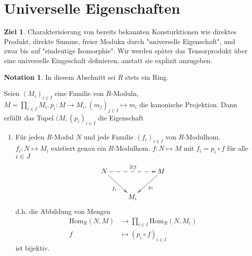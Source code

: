 \documentclass[a4paper, titlepage]{article}
\theoremstyle{definition}
\newtheorem*{ziel}{Ziel}
\newtheorem*{notation}{Notation}
\newcommand{\Hom}{\mathrm{Hom}}
\begin{document}
        \section{Universelle Eigenschaften}
        \begin{ziel}
            Charakterisierung von bereits bekannten Konsturktionen wie direktes Produkt, direkte Summe, freier Modukn durch "universelle Eigenschaft", und zwar bis auf "eindeutige Isomorphie". Wir werden später das Tensorprodukt über eine universelle Eingeschaft definieren, anstatt sie explizit anzugeben.
        \end{ziel}
        \begin{notation}
            In diesem Abschnitt sei $R$ stets ein Ring.
        \end{notation}
        \begin{satz}
            Seien $(M_i)_{i\in I}$ eine Familie von $R$-Moduln, $M=\prod\limits_{i\in I}M_i, p_i:M\longrightarrow M_i, (m_j)_{j\in I}\longmapsto m_i$ die kanonische Projektion. Dann erfüllt das Tupel $(M,(p_i)_{i\in I}$ die Eigenschaft
         \begin{enumerate}[(UP)]
                \item Für jeden $R$-Modul $N$ und jede Familie $(f_i)_{i\in I}$ von $R$-Modulhom. $f_i:N\mapsto M_i$ existiert genau ein $R$-Modulhom. $f:N\mapsto M $ mit $f_i=p_i\circ f$ für alle $i\in J$
                \[ 
                \begin{xy}
                    \xymatrix{
                    N \ar@{-->}[rr]^{\exists!f} \ar[dr]_{f_i} &&M\ar[dl]^{p_i}\\
                    &M_i&
                    }
                \end{xy}
                \]
                d.h. die Abbildung von Mengen 
                \begin{align*}
                    \Hom_R(N,M)&\longrightarrow \prod_{i\in I}\Hom_R(N,M_i)\\
                    f&\longmapsto (p_i\circ f)_{i\in I}
                \end{align*}
                ist bijektiv.
            \end{enumerate}
        \end{satz}
\end{document}
